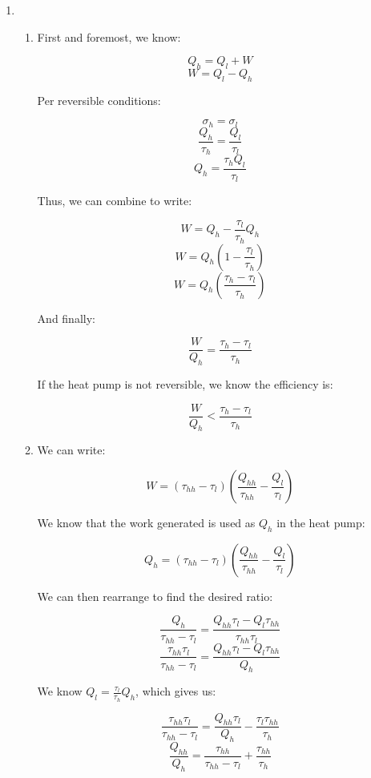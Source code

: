 \begin{enumerate}

  \item

    \begin{enumerate}

      \item 

        First and foremost, we know:

        $$Q_h=Q_l+W$$
        $$W=Q_l-Q_h$$

        Per reversible conditions:

        $$\sigma_h=\sigma_l$$
        $$\frac{Q_h}{\tau_h}=\frac{Q_l}{\tau_l}$$
        $$Q_h=\frac{\tau_hQ_l}{\tau_l}$$

        Thus, we can combine to write:

        $$W=Q_h-\frac{\tau_l}{\tau_h}Q_h$$
        $$W=Q_h\left( 1-\frac{\tau_l}{\tau_h}\right)$$
        $$W=Q_h\left( \frac{\tau_h-\tau_l}{\tau_h}\right)$$

        And finally:

        $$\boxed{\frac{W}{Q_h}=\frac{\tau_h-\tau_l}{\tau_h}}$$

        If the heat pump is not reversible, we know the efficiency is:

        $$\frac{W}{Q_h}<\frac{\tau_h-\tau_l}{\tau_h}$$

      \item 

        We can write:

        $$W=(\tau_{hh}-\tau_l)\left( \frac{Q_{hh}}{\tau_{hh}}-\frac{Q_l}{\tau_l} \right)$$

        We know that the work generated is used as $Q_h$ in the heat pump:

        $$Q_h=(\tau_{hh}-\tau_l)\left( \frac{Q_{hh}}{\tau_{hh}}-\frac{Q_l}{\tau_l} \right)$$

        We can then rearrange to find the desired ratio:

        $$\frac{Q_h}{\tau_{hh}-\tau_l}=\frac{Q_{hh}\tau_l-Q_l\tau_{hh}}{\tau_{hh}\tau_l}$$
        $$\frac{\tau_{hh}\tau_l}{\tau_{hh}-\tau_l}=\frac{Q_{hh}\tau_l-Q_l\tau_{hh}}{Q_h}$$

        We know $Q_l=\frac{\tau_l}{\tau_h}Q_h$, which gives us:

        $$\frac{\tau_{hh}\tau_l}{\tau_{hh}-\tau_l}=\frac{Q_{hh}\tau_l}{Q_h}-\frac{\tau_l\tau_{hh}}{\tau_h}$$
        $$\boxed{\frac{Q_{hh}}{Q_h}=\frac{\tau_{hh}}{\tau_{hh}-\tau_l}+\frac{\tau_{hh}}{\tau_h}}$$


\end{enumerate}
\end{enumerate}
